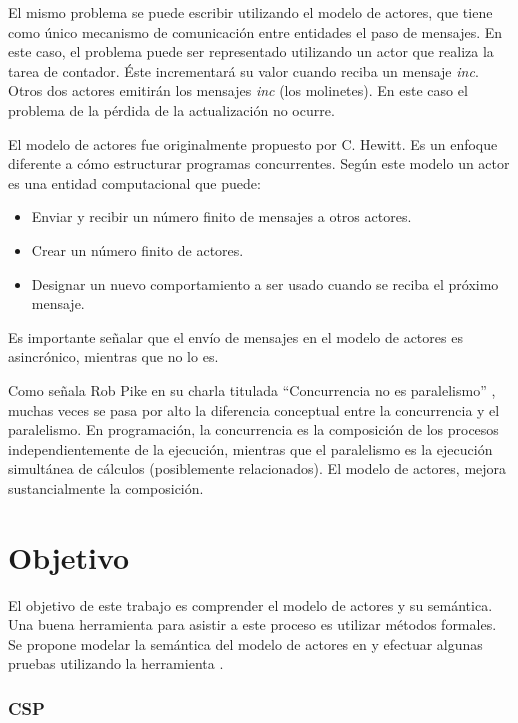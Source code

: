 El mismo problema se puede escribir utilizando el modelo de actores, que tiene como único mecanismo de comunicación entre entidades el paso de mensajes. En este caso, el problema puede ser representado utilizando un actor que realiza la tarea de contador. Éste incrementará su valor cuando reciba un mensaje \emph{inc}. Otros dos actores emitirán los mensajes \emph{inc} (los molinetes). En este caso el problema de la pérdida de la actualización no ocurre.

El modelo de actores fue originalmente propuesto por C. Hewitt\cite{Hewitt:1973:UMA:1624775.1624804}. Es un enfoque diferente a cómo estructurar programas concurrentes. Según este modelo un actor es una entidad computacional que puede:

\begin{itemize}
\item Enviar y recibir un número finito de mensajes a otros actores.
\item Crear un número finito de actores.
\item Designar un nuevo comportamiento a ser usado cuando se reciba el próximo mensaje.
\end{itemize}

Es importante señalar que el envío de mensajes en el modelo de actores es asincrónico, mientras que \CSP no lo es.

Como señala Rob Pike en su charla titulada ``Concurrencia no es paralelismo'' \cite{rpike13:cnp}, muchas veces se pasa por alto la diferencia conceptual entre la concurrencia y el paralelismo. En programación, la concurrencia es la composición de los procesos independientemente de la ejecución, mientras que el paralelismo es la ejecución simultánea de cálculos (posiblemente relacionados). El modelo de actores, mejora sustancialmente la composición.

\section{Objetivo}
El objetivo de este trabajo es comprender el modelo de actores y su semántica. Una buena herramienta para asistir a este proceso es utilizar métodos formales. Se propone modelar la semántica del modelo de actores en \CSP y efectuar algunas pruebas utilizando la herramienta \FDR\cite{fdr}.

\subsubsection*{CSP}

